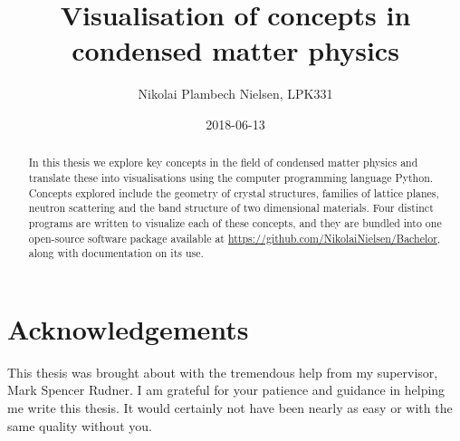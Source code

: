 \documentclass[a4paper,11pt]{article}
\title{Visualisation of concepts in condensed matter physics}
\author{Nikolai Plambech Nielsen, LPK331}
\date{2018-06-13}
\numberwithin{equation}{section}
\begin{document}
	
	
	
	
	\begin{abstract}
		In this thesis we explore key concepts in the field of condensed matter physics and translate these into visualisations using the computer programming language Python. Concepts explored include the geometry of crystal structures, families of lattice planes, neutron scattering and the band structure of two dimensional materials. Four distinct programs are written to visualize each of these concepts, and they are bundled into one open-source software package available at \url{https://github.com/NikolaiNielsen/Bachelor}, along with documentation on its use.
	\end{abstract}
	\section*{Acknowledgements}
	This thesis was brought about with the tremendous help from my supervisor, Mark Spencer Rudner. I am grateful for your patience and guidance in helping me write this thesis. It would certainly not have been nearly as easy or with the same quality without you.
	
	
	\tableofcontents
	
	\newpage
	
	\setcounter{page}{1}
	
	
	
	
	
	
	
	
	
	
	
	
	
	\newpage
	\appendix
	
	
\end{document}
